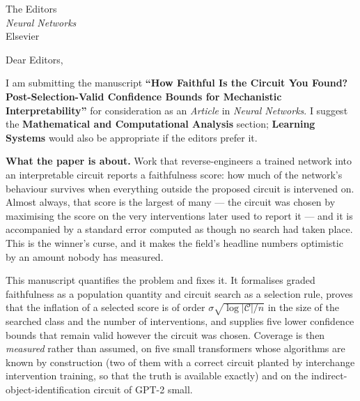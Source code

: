 \documentclass[11pt]{letter}
\begin{document}
\begin{letter}{The Editors\\ \textit{Neural Networks}\\ Elsevier}

\opening{Dear Editors,}

I am submitting the manuscript \textbf{``How Faithful Is the Circuit You Found?
Post-Selection-Valid Confidence Bounds for Mechanistic Interpretability''} for
consideration as an \emph{Article} in \textit{Neural Networks}. I suggest the
\textbf{Mathematical and Computational Analysis} section; \textbf{Learning
Systems} would also be appropriate if the editors prefer it.

\medskip
\noindent\textbf{What the paper is about.}
Work that reverse-engineers a trained network into an interpretable circuit
reports a faithfulness score: how much of the network's behaviour survives when
everything outside the proposed circuit is intervened on. Almost always, that
score is the largest of many --- the circuit was chosen by maximising the score
on the very interventions later used to report it --- and it is accompanied by a
standard error computed as though no search had taken place. This is the winner's
curse, and it makes the field's headline numbers optimistic by an amount nobody
has measured.

This manuscript quantifies the problem and fixes it. It formalises graded
faithfulness as a population quantity and circuit search as a selection rule,
proves that the inflation of a selected score is of order
$\sigma\sqrt{\log|\mathcal{C}|/n}$ in the size of the searched class and the
number of interventions, and supplies five lower confidence bounds that remain
valid however the circuit was chosen. Coverage is then \emph{measured} rather
than assumed, on five small transformers whose algorithms are known by
construction (two of them with a correct circuit planted by interchange
intervention training, so that the truth is available exactly) and on the
indirect-object-identification circuit of GPT-2 small.


\end{letter}
\end{document}
